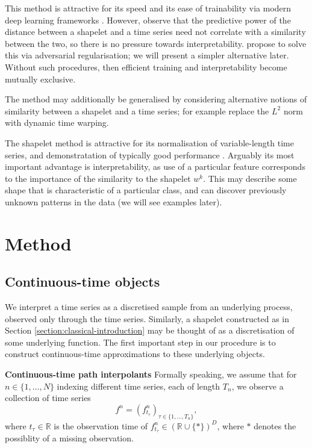 \documentclass{article}
\theoremstyle{plain}
\theoremstyle{definition}
\newcommand{\reals}{\mathbb{R}}
\newcommand{\boldheading}[1]{

\textbf{#1}\quad}
\begin{document}
	This method is attractive for its speed and its ease of trainability via modern deep learning frameworks \cite{tensorflow, pytorch, jax}. However, \cite{wang2019interp} observe that the predictive power of the distance between a shapelet and a time series need not correlate with a similarity between the two, so there is no pressure towards interpretability. \cite{wang2019interp} propose to solve this via adversarial regularisation; we will present a simpler alternative later. Without such procedures, then efficient training and interpretability become mutually exclusive.
	
	The method may additionally be generalised by considering alternative notions of similarity between a shapelet and a time series; for example \cite{grabocka2016dtwshapelet} replace the $L^2$ norm with dynamic time warping.
	
	The shapelet method is attractive for its normalisation of variable-length time series, and demonstratation of typically good performance \cite{bagnall2016bakeoff, bostrom2015shapelet}. Arguably its most important advantage is interpretability, as use of a particular feature corresponds to the importance of the similarity to the shapelet $w^{k}$. This may describe some shape that is characteristic of a particular class, and can discover previously unknown patterns in the data (we will see examples later).
	
	\section{Method}
	\subsection{Continuous-time objects}
	We interpret a time series as a discretised sample from an underlying process, observed only through the time series. Similarly, a shapelet constructed as in Section \ref{section:classical-introduction} may be thought of as a discretisation of some underlying function. The first important step in our procedure is to construct continuous-time approximations to these underlying objects.
	
	\boldheading{Continuous-time path interpolants}
	Formally speaking, we assume that for $n \in \{1, \ldots, N\}$ indexing different time series, each of length $T_n$, we observe a collection of time series
	\begin{equation*}
	f^n = (f^n_{t_\tau})_{\tau \in \{1, \ldots, T_n\}},
	\end{equation*}
	where $t_\tau \in \reals$ is the observation time of $f^n_{t_\tau} \in (\reals \cup \{*\})^D$, where $*$ denotes the possiblity of a missing observation.%
	
\end{document}
